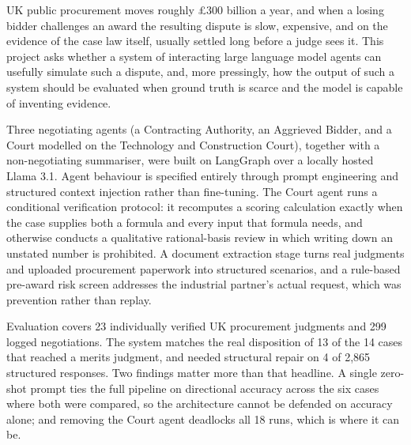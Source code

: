 {
UK public procurement moves roughly \pounds300 billion a year, and when a losing
bidder challenges an award the resulting dispute is slow, expensive, and on the
evidence of the case law itself, usually settled long before a judge sees it.
This project asks whether a system of interacting large language model agents can
usefully simulate such a dispute, and, more pressingly, how the output of such a
system should be evaluated when ground truth is scarce and the model is capable of
inventing evidence.

Three negotiating agents (a Contracting Authority, an Aggrieved Bidder, and a
Court modelled on the Technology and Construction Court), together with a
non-negotiating summariser, were built on LangGraph over a locally hosted Llama
3.1. Agent behaviour is specified entirely through prompt engineering and
structured context injection rather than fine-tuning. The Court agent runs a
conditional verification protocol: it recomputes a scoring calculation exactly
when the case supplies both a formula and every input that formula needs, and
otherwise conducts a qualitative rational-basis review in which writing down an
unstated number is prohibited. A document extraction stage turns real judgments
and uploaded procurement paperwork into structured scenarios, and a rule-based
pre-award risk screen addresses the industrial partner's actual request, which was
prevention rather than replay.

Evaluation covers 23 individually verified UK procurement judgments and 299 logged
negotiations. The system matches the real disposition of 13 of the 14 cases that
reached a merits judgment, and needed structural repair on 4 of 2,865 structured
responses. Two findings matter more than that headline. A single zero-shot prompt
ties the full pipeline on directional accuracy across the six cases where both were
compared, so the architecture cannot be defended on accuracy alone; and removing
the Court agent deadlocks all 18 runs, which is where it can be.
}
